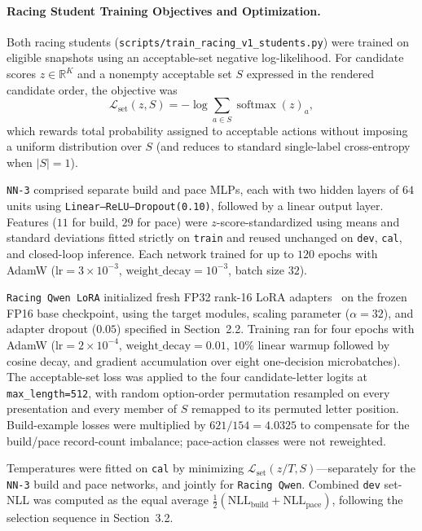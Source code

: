 \documentclass[11pt,a4paper]{article}
\begin{document}
\paragraph{Racing Student Training Objectives and Optimization.}
Both racing students (\texttt{scripts/train\_racing\_v1\_students.py}) were trained on eligible snapshots using an acceptable-set negative log-likelihood. For candidate scores $z \in \mathbb{R}^{K}$ and a nonempty acceptable set $S$ expressed in the rendered candidate order, the objective was
\begin{equation}
\mathcal{L}_{\text{set}}(z, S) = -\log \sum_{a \in S} \operatorname{softmax}(z)_a,
\end{equation}
which rewards total probability assigned to acceptable actions without imposing a uniform distribution over $S$ (and reduces to standard single-label cross-entropy when $|S|=1$).

\texttt{NN-3} comprised separate build and pace MLPs, each with two hidden layers of $64$ units using \texttt{Linear--ReLU--Dropout(0.10)}, followed by a linear output layer. Features ($11$ for build, $29$ for pace) were $z$-score-standardized using means and standard deviations fitted strictly on \texttt{train} and reused unchanged on \texttt{dev}, \texttt{cal}, and closed-loop inference. Each network trained for up to $120$ epochs with AdamW ($\text{lr}=3\times 10^{-3}$, $\text{weight\_decay}=10^{-3}$, batch size $32$).

\texttt{Racing Qwen LoRA} initialized fresh FP32 rank-16 LoRA adapters~\cite{hu2022lora} on the frozen FP16 base checkpoint, using the target modules, scaling parameter ($\alpha=32$), and adapter dropout ($0.05$) specified in Section~2.2. Training ran for four epochs with AdamW ($\text{lr}=2\times 10^{-4}$, $\text{weight\_decay}=0.01$, $10\%$ linear warmup followed by cosine decay, and gradient accumulation over eight one-decision microbatches). The acceptable-set loss was applied to the four candidate-letter logits at \texttt{max\_length=512}, with random option-order permutation resampled on every presentation and every member of $S$ remapped to its permuted letter position. Build-example losses were multiplied by $621/154 = 4.0325$ to compensate for the build/pace record-count imbalance; pace-action classes were not reweighted.

Temperatures were fitted on \texttt{cal} by minimizing $\mathcal{L}_{\text{set}}(z/T, S)$---separately for the \texttt{NN-3} build and pace networks, and jointly for \texttt{Racing Qwen}. Combined \texttt{dev} set-NLL was computed as the equal average $\tfrac{1}{2}(\text{NLL}_{\text{build}} + \text{NLL}_{\text{pace}})$, following the selection sequence in Section~3.2.
\end{document}
